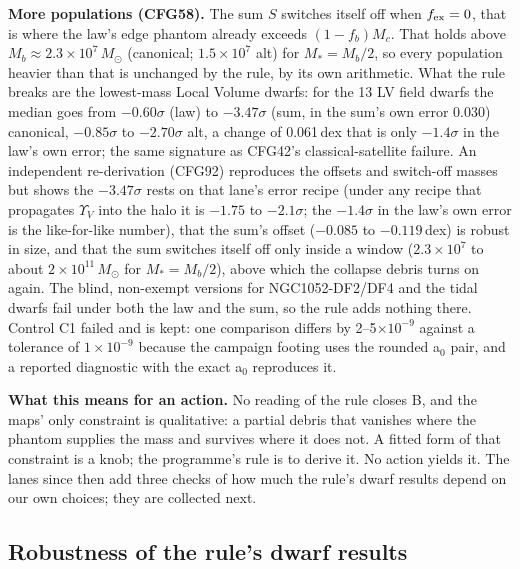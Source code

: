 \documentclass[10pt]{article}
\begin{document}
\textbf{More populations (CFG58).} The sum $S$ switches itself off when $f_{\rm ex}=0$, that is where the law's edge phantom already exceeds $(1-f_b)M_c$. That holds above $M_b\approx2.3\times10^7\,M_\odot$ (canonical; $1.5\times10^7$ alt) for $M_*=M_b/2$, so every population heavier than that is unchanged by the rule, by its own arithmetic. What the rule breaks are the lowest-mass Local Volume dwarfs: for the 13 LV field dwarfs the median goes from $-0.60\sigma$ (law) to $-3.47\sigma$ (sum, in the sum's own error 0.030) canonical, $-0.85\sigma$ to $-2.70\sigma$ alt, a change of 0.061\,dex that is only $-1.4\sigma$ in the law's own error; the same signature as CFG42's classical-satellite failure. An independent re-derivation (CFG92) reproduces the offsets and switch-off masses but shows the $-3.47\sigma$ rests on that lane's error recipe (under any recipe that propagates $\Upsilon_V$ into the halo it is $-1.75$ to $-2.1\sigma$; the $-1.4\sigma$ in the law's own error is the like-for-like number), that the sum's offset ($-0.085$ to $-0.119$\,dex) is robust in size, and that the sum switches itself off only inside a window ($2.3\times10^7$ to about $2\times10^{11}\,M_\odot$ for $M_*=M_b/2$), above which the collapse debris turns on again. The blind, non-exempt versions for NGC1052-DF2/DF4 and the tidal dwarfs fail under both the law and the sum, so the rule adds nothing there. Control C1 failed and is kept: one comparison differs by 2--5$\times10^{-9}$ against a tolerance of $1\times10^{-9}$ because the campaign footing uses the rounded a$_0$ pair, and a reported diagnostic with the exact a$_0$ reproduces it.

\textbf{What this means for an action.} No reading of the rule closes B, and the maps' only constraint is qualitative: a partial debris that vanishes where the phantom supplies the mass and survives where it does not. A fitted form of that constraint is a knob; the programme's rule is to derive it. No action yields it. The lanes since then add three checks of how much the rule's dwarf results depend on our own choices; they are collected next.

\subsection{Robustness of the rule's dwarf results}\label{sec:robust}
\end{document}
